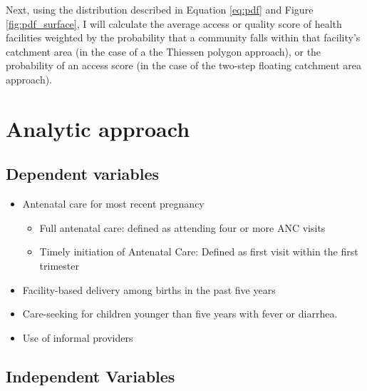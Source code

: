Next, using the distribution described in Equation \ref{eq:pdf} and Figure \ref{fig:pdf_surface}, I will calculate the average access or quality score of health facilities weighted by the probability that a community falls within that facility's catchment area (in the case of a the Thiessen polygon approach), or the probability of an access score (in the case of the two-step floating catchment area approach).

\section{Analytic approach}

\subsection{Dependent variables}

\begin{itemize}
    \item Antenatal care for most recent pregnancy
    \begin{itemize}
        \item Full antenatal care: defined as attending four or more ANC visits
        \item Timely initiation of Antenatal Care: Defined as first visit within the first trimester
    \end{itemize}
    \item Facility-based delivery among births in the past five years
    \item Care-seeking for children younger than five years with fever or diarrhea.
    \item Use of informal providers
\end{itemize}

\subsection{Independent Variables}

